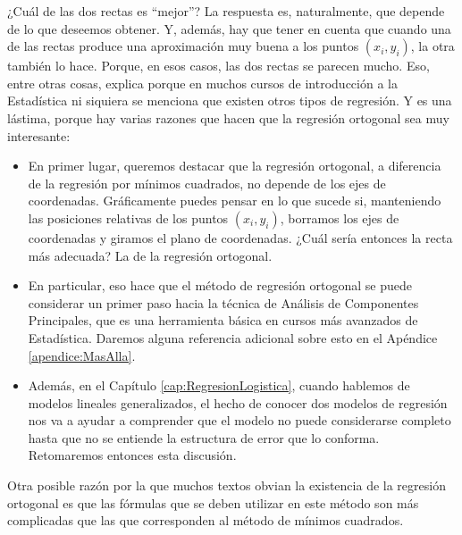 ¿Cuál de las dos rectas es ``mejor''? La respuesta es, naturalmente, que depende de lo que deseemos obtener. Y, además, hay que tener en cuenta que cuando una de las rectas produce una aproximación muy buena a los puntos $(x_i, y_i)$, la otra también lo hace. Porque, en esos casos, las dos rectas se parecen mucho. Eso, entre otras cosas, explica porque en muchos cursos de introducción a la Estadística ni siquiera se menciona que existen otros tipos de regresión. Y es una lástima, porque hay varias razones que hacen que la regresión ortogonal sea muy interesante:
\begin{itemize}
  \item En primer lugar, queremos destacar que la regresión ortogonal, a diferencia de la regresión por mínimos cuadrados, no depende de los ejes de coordenadas. Gráficamente puedes pensar en lo que sucede si, manteniendo las posiciones relativas de los puntos $(x_i, y_i)$, borramos los ejes de coordenadas y giramos el plano de coordenadas. ¿Cuál sería entonces la recta más adecuada? La de la regresión ortogonal.
  \item En particular, eso hace que el método de regresión ortogonal se puede considerar un primer paso hacia la técnica de Análisis de Componentes Principales, que es una herramienta básica en cursos más avanzados de Estadística. Daremos alguna referencia adicional sobre esto en el Apéndice \ref{apendice:MasAlla}.

  \item Además, en el Capítulo \ref{cap:RegresionLogistica}, cuando hablemos de modelos lineales generalizados, el hecho de conocer dos modelos de regresión nos va a ayudar a comprender que el modelo no puede considerarse completo hasta que no se entiende la estructura de error que lo conforma. Retomaremos entonces esta discusión.

\end{itemize}
Otra posible razón por la que muchos textos obvian la existencia de la regresión ortogonal es que las fórmulas que se deben utilizar en este método son más complicadas que las que corresponden al método de mínimos cuadrados.


